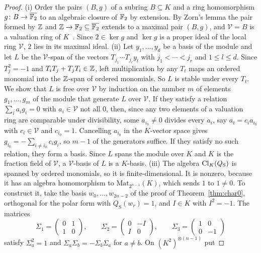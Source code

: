 \begin{proof}
(i) Order the pairs $(B,g)$ of a subring $B\subseteq K$ and a ring homomorphism $g\colon B\to\overline{\mathbb{F}_2}$ to an algebraic closure of $\mathbb{F}_2$ by extension. By Zorn's lemma the pair formed by $\mathbb{Z}$ and $\mathbb{Z}\to\mathbb{F}_2\subseteq\overline{\mathbb{F}_2}$ extends to a maximal pair $(B,g)$, and $\mathcal V=B$ is a valuation ring of $K$~\cite[Thm.~5.21]{AM69}. Since $2\in\ker g$ and $\ker g$ is a proper ideal of the local ring $\mathcal V$, $2$ lies in its maximal ideal. (ii) Let $y_1,\dots,y_d$ be a basis of the module and let $L$ be the $\mathcal V$-span of the vectors $T_{j_1}\cdots T_{j_r}y_l$ with $j_1<\cdots<j_r$ and $1\le l\le d$. Since $T_j^2=-1$ and $T_{i}T_j+T_{j}T_i\in\mathbb{Z}$, left multiplication by any $T_t$ maps an ordered monomial into the $\mathbb{Z}$-span of ordered monomials. So $L$ is stable under every $T_t$. We show that $L$ is free over $\mathcal V$ by induction on the number $m$ of elements $g_1,\dots,g_m$ of the module that generate $L$ over $\mathcal V$. If they satisfy a relation $\sum_{i}a_{i}g_i=0$ with $a_i\in\mathcal V$ not all $0$, then, since any two elements of a valuation ring are comparable under divisibility, some $a_{i_0}\ne0$ divides every $a_i$, say $a_i=c_{i}a_{i_0}$ with $c_i\in\mathcal V$ and $c_{i_0}=1$. Cancelling $a_{i_0}$ in the $K$-vector space gives $g_{i_0}=-\sum_{i\ne i_0}c_{i}g_i$, so $m-1$ of the generators suffice. If they satisfy no such relation, they form a basis. Since $L$ spans the module over $K$ and $K$ is the fraction field of $\mathcal V$, a $\mathcal V$-basis of $L$ is a $K$-basis. (iii) The algebra $\operatorname{Cl}_K(Q_{\mathrm S})$ is spanned by ordered monomials, so it is finite-dimensional. It is nonzero, because it has an algebra homomorphism to $\mathrm{Mat}_{2^{n-1}}(K)$, which sends $1$ to $1\ne0$. To construct it, take the basis $w_0,\dots,w_{2n-2}$ of the proof of Theorem~\ref{thm:char0}, orthogonal for the polar form with $Q_{\mathrm S}(w_r)=1$, and $I\in K$ with $I^2=-1$. The matrices
\[
\Sigma_1=\begin{pmatrix}0&1\\1&0\end{pmatrix},\qquad\Sigma_2=\begin{pmatrix}0&-I\\I&0\end{pmatrix},\qquad\Sigma_3=\begin{pmatrix}1&0\\0&-1\end{pmatrix}
\]
satisfy $\Sigma_a^2=1$ and $\Sigma_a\Sigma_b=-\Sigma_b\Sigma_a$ for $a\ne b$. On ${(K^2)}^{\otimes(n-1)}$ put

\end{proof}
